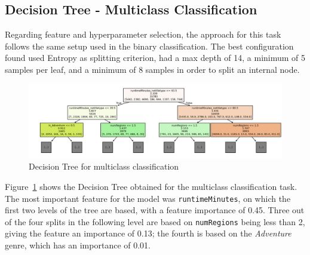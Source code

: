 \subsection{Decision Tree - Multiclass Classification}
Regarding feature and hyperparameter selection, the approach for this task follows the same setup used in the binary classification.
The best configuration found used Entropy as splitting criterion, had a max depth of 14, a minimum of
5 samples per leaf, and a minimum of 8 samples in order to split an internal node.
\begin{figure}[H]
    \centering
    \includegraphics[width=0.88\linewidth]{plots/multiclass_tree.png}
    \captionsetup{justification=centering, width=0.9\linewidth}
    \caption{Decision Tree for multiclass classification}
    \label{fig:multiclass_dt}
\end{figure}
Figure~\ref{fig:multiclass_dt} shows the Decision Tree obtained for the multiclass classification task.
The most important feature for the model was \texttt{runtimeMinutes}, on which the first two levels
of the tree are based, with a feature importance of 0.45.
Three out of the four splits in the following level are based on \texttt{numRegions} being less than
2, giving the feature an importance of 0.13; the fourth is based on the \textit{Adventure} genre,
which has an importance of 0.01.
